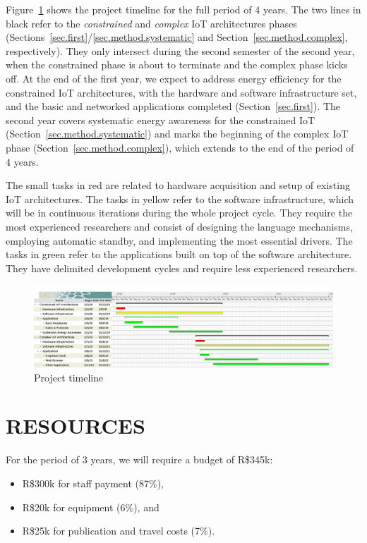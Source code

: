 \documentclass[12pt,english]{amsart}
\begin{document}
Figure~\ref{fig.timeline} shows the project timeline for the full period of 4
years.
The two lines in black refer to the \emph{constrained} and \emph{complex} IoT
architectures phases (Sections~\ref{sec.first}/\ref{sec.method.systematic} and
Section~\ref{sec.method.complex}, respectively).
They only intersect during the second semester of the second year, when the
constrained phase is about to terminate and the complex phase kicks off.
At the end of the first year, we expect to address energy efficiency for the
constrained IoT architectures, with the hardware and software
infrastructure set, and the basic and networked applications completed
(Section~\ref{sec.first}).
The second year covers systematic energy awareness for the constrained IoT
(Section~\ref{sec.method.systematic}) and marks the beginning of the complex IoT
phase (Section~\ref{sec.method.complex}), which extends to the end of the
period of 4 years.

The small tasks in red are related to hardware acquisition and setup of
existing IoT architectures.
The tasks in yellow refer to the software infrastructure, which will be in
continuous iterations during the whole project cycle.
They require the most experienced researchers and consist of designing the
language mechanisms, employing automatic standby, and implementing the most
essential drivers.
The tasks in green refer to the applications built on top of the software
architecture.
They have delimited development cycles and require less experienced
researchers.

\begin{figure}
    \vspace{17cm}
    \includegraphics[width=\columnwidth]{serra-big}
    \caption{Project timeline
        \label{fig.timeline}
    }
\end{figure}

\section{RESOURCES}

For the period of 3 years, we will require a budget of R\$345k:
\begin{itemize}
    \item R\$300k for staff payment (87\%),
    \item R\$20k for equipment (6\%), and
    \item R\$25k for publication and travel costs (7\%).
\end{itemize}
\end{document}
